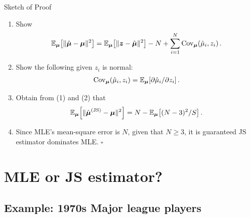 \documentclass{beamer}
\begin{document}
\begin{frame}{Sketch of Proof}
	\begin{enumerate}
		\item
			Show
			\begin{align*}
				\E[\bfmu]{\|\hat{\bfmu}-\bfmu\|^2}
				= \E[\bfmu]{\|\bfz-\hat{\bfmu}\|^2}-N
				+ \sum_{i=1}^{N}\cov[\bfmu]{\hat{\mu}_i,z_i}.
			\end{align*}
		\item
			Show the following given $z_i$ is normal:
			\begin{align*}
				\cov[\bfmu]{\hat{\mu}_i,z_i}
				=\E[\bfmu]{\partial\hat{\mu}_i/\partial z_i}.
			\end{align*}
		\item
			Obtain from (1) and (2) that
			\begin{align*}
				\E[\bfmu]{\|\hat{\bfmu}^{\text{(JS)}}-\bfmu\|^2}
				=N-\E[\bfmu]{(N-3)^2/S}.
			\end{align*}
		\item
			Since MLE's mean-square error is $N$,
			given that $N\geq 3$,
			it is guaranteed JS estimator dominates MLE.
			\hfill$\square$
	\end{enumerate}
\end{frame}

\section{MLE or JS estimator?}

\subsection{Example: 1970s Major league players}
\end{document}
